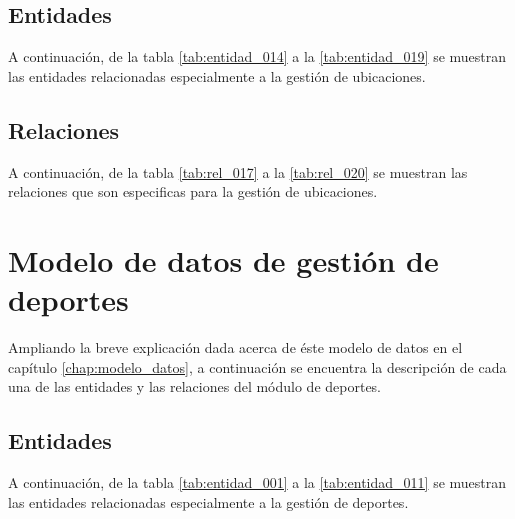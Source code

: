 \subsection{Entidades}
A continuación, de la tabla \ref{tab:entidad_014} a la \ref{tab:entidad_019} se muestran las entidades relacionadas especialmente a la gestión de ubicaciones.

\clearpage







\subsection{Relaciones}
A continuación, de la tabla \ref{tab:rel_017} a la \ref{tab:rel_020} se muestran las relaciones que son especificas para la gestión de ubicaciones.

\clearpage





\section{Modelo de datos de gestión de deportes}
Ampliando la breve explicación dada acerca de éste modelo de datos en el capítulo \ref{chap:modelo_datos}, a continuación se encuentra la descripción de cada una de las entidades y las relaciones del módulo de deportes.

\subsection{Entidades}
A continuación, de la tabla \ref{tab:entidad_001} a la \ref{tab:entidad_011} se muestran las entidades relacionadas especialmente a la gestión de deportes.

\clearpage












